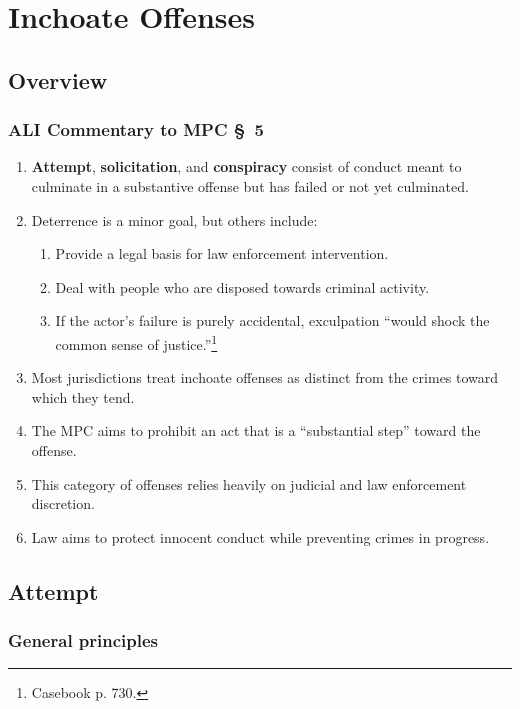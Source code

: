 \section{Inchoate Offenses}

\subsection{Overview}

\subsubsection{ALI Commentary to MPC \S\ 5}

\begin{enumerate}
    \item \textbf{Attempt}, \textbf{solicitation}, and \textbf{conspiracy} 
    consist of conduct meant to culminate in a substantive offense but has 
    failed or not yet culminated.
    \item Deterrence is a minor goal, but others include:
    \begin{enumerate}
        \item Provide a legal basis for law enforcement intervention.
        \item Deal with people who are disposed towards criminal activity.
        \item If the actor's failure is purely accidental, exculpation ``would 
        shock the common sense of justice.''\footnote{Casebook p. 730.}
    \end{enumerate}
    \item Most jurisdictions treat inchoate offenses as distinct from the 
    crimes toward which they tend.
    \item The MPC aims to prohibit an act that is a ``substantial step'' 
    toward the offense.
    \item This category of offenses relies heavily on judicial and law 
    enforcement discretion.
    \item Law aims to protect innocent conduct while preventing crimes in 
    progress.
\end{enumerate}

\subsection{Attempt}

\subsubsection{General principles}

